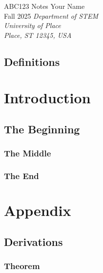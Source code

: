 \documentclass[12pt, twoside]{report}
\newcommand{\name}{Your Name}              %
\newcommand{\semester}{Fall 2025}        %
\newcommand{\hwTitle}{ABC123 Notes}  %
\begin{document}
\begin{titlepage}
\begin{center}
    \vspace*{1.5in}
    {\Large{\hwTitle}}
    \vskip 0.25in \name\\
    \semester
    \vskip 0.25in {\it Department of STEM\\ University of Place\\ Place, ST 12345, USA}
\end{center}
\vskip 0.5in
\end{titlepage}

\pagestyle{empty}       %
\hypertarget{toc}{}
\tableofcontents        %

\chapter*{Definitions}  %
\pagestyle{fancy}       %



\part{Introduction}     %

\chapter{The Beginning}\label{ch:begin}     %

    \section{The Middle}\label{sec:middle}  %
    
    
    
    \section[3]{The End}    %
    



\newpage
\part{Appendix}     %

\begin{appendices}  %

\chapter{Derivations}

    \section{Theorem}\label{app:theorem}
    

\end{appendices}
\printbibliography  %
\end{document}
